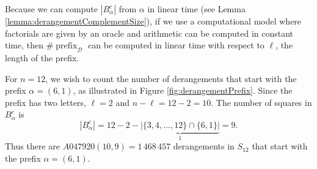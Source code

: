 Because we can compute $|B_\alpha^c|$ from $\alpha$ in linear time
(see Lemma \ref{lemma:derangementComplementSize}), if we use a computational
model where factorials are given by an oracle and arithmetic can be computed
in constant time, then $\#\operatorname{prefix}_\mathcal{D}$ can be computed
in linear time with respect to $\ell$, the length of the prefix.

\begin{example}
  For $n = 12$, we wish to count the number of derangements that
  start with the prefix $\alpha = (6,1)$, as illustrated in Figure
  \ref{fig:derangementPrefix}.
  Since the prefix has two letters, $\ell = 2$ and $n - \ell = 12 - 2 = 10$.
  The number of squares in $B_\alpha^c$ is \begin{equation}
    |B_\alpha^c| = 12 - 2 - \underbrace{|\{3,4,\dots,12\} \cap \{6, 1\}|}_1 = 9.
  \end{equation}
  Thus there are $A047920(10,9) = 1\,468\,457$ derangements in $S_{12}$
  that start with the prefix $\alpha = (6,1)$.
\end{example}

